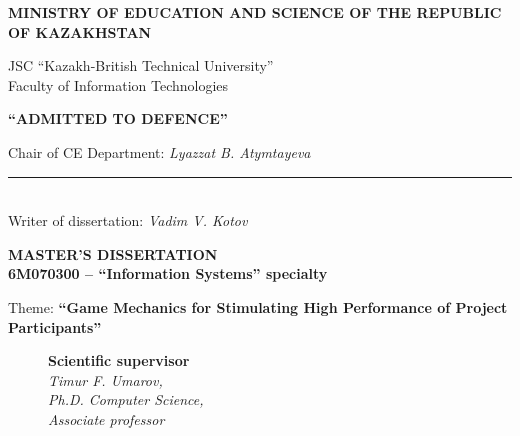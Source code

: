 \begin{titlepage}
    \pagestyle{empty}
    \begin{center}
        {\bf{\MakeUppercase{Ministry of education and science of the republic of Kazakhstan}}

        \vspace{14pt}

        JSC ``Kazakh-British Technical University''\\
        Faculty of Information Technologies}
       
       \vspace{14pt}
       
        \begin{flushright}
            {\bf \MakeUppercase{``Admitted to defence''}}

            Chair of CE Department: {\em Lyazzat B. Atymtayeva}\\
            \vspace{0.5\baselineskip}
            \rule{13em}{0.4pt}\\
            \vspace{14pt}
          Writer of dissertation: {\em Vadim V. Kotov}
          \vspace{14pt}
        \end{flushright}
        
        {\bf
        \MakeUppercase{Master's Dissertation}\\
        6M070300 -- ``Information Systems'' specialty}

        \vspace{14pt}

        Theme: {\bf ``Game Mechanics for Stimulating High Performance of Project Participants''}
        
        \vspace{28pt}
        
        \begin{figure}[ht]
            \begin{minipage}[t]{0.6\linewidth}
                {\bf Scientific supervisor}\\

                {\em Timur F. Umarov,\\
                Ph.D. Computer Science,\\
                Associate professor}\\
            \end{minipage}
        \end{figure}


\end{center}
\end{titlepage}
